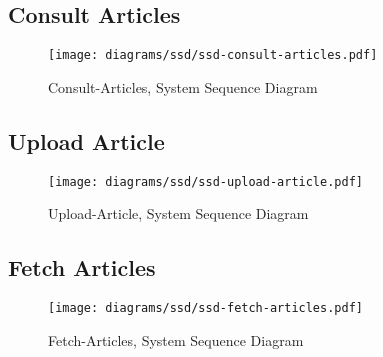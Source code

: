 \subsection{Consult Articles}
\label{subsec:consult-articles}
\begin{figure}[H]
    \texttt{[image: diagrams/ssd/ssd-consult-articles.pdf]}
    \caption{Consult-Articles, System Sequence Diagram}
    \label{fig:consult-articles-ssd}
\end{figure}
\newpage

\subsection{Upload Article}
\label{subsec:upload-article}
\begin{figure}[H]
    \texttt{[image: diagrams/ssd/ssd-upload-article.pdf]}
    \caption{Upload-Article, System Sequence Diagram}
    \label{fig:upload-article-ssd}
\end{figure}
\newpage

\subsection{Fetch Articles}
\label{subsec:fetch-articles}
\begin{figure}[H]
    \texttt{[image: diagrams/ssd/ssd-fetch-articles.pdf]}
    \caption{Fetch-Articles, System Sequence Diagram}
    \label{fig:fetch-articles-ssd}
\end{figure}
\newpage

